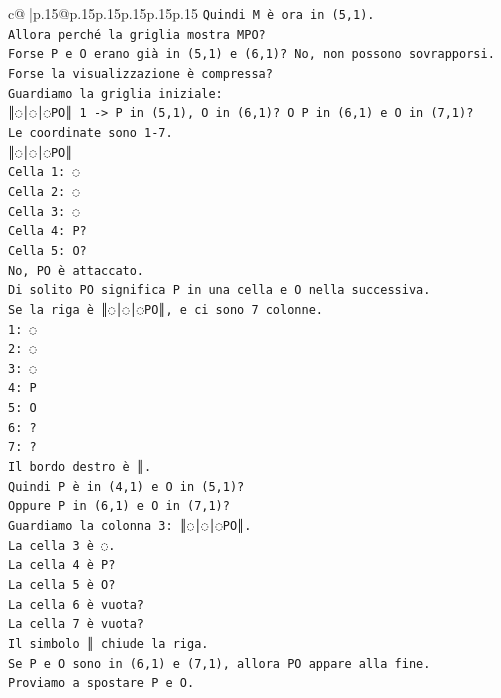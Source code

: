 \documentclass{article}
\begin{document}
{\begin{supertabular}{c@{$\;$}|p{.15\linewidth}@{}p{.15\linewidth}p{.15\linewidth}p{.15\linewidth}p{.15\linewidth}p{.15\linewidth}}
{{{\texttt{Quindi M è ora in (5,1).} \\
\texttt{Allora perché la griglia mostra MPO?} \\
\texttt{Forse P e O erano già in (5,1) e (6,1)? No, non possono sovrapporsi.} \\
\texttt{Forse la visualizzazione è compressa?} \\
\texttt{Guardiamo la griglia iniziale:} \\
\texttt{║◌│◌│◌PO║ 1 {-}> P in (5,1), O in (6,1)? O P in (6,1) e O in (7,1)?} \\
\texttt{Le coordinate sono 1{-}7.} \\
\texttt{║◌│◌│◌PO║} \\
\texttt{Cella 1: ◌} \\
\texttt{Cella 2: ◌} \\
\texttt{Cella 3: ◌} \\
\texttt{Cella 4: P?} \\
\texttt{Cella 5: O?} \\
\texttt{No, PO è attaccato.} \\
\texttt{Di solito PO significa P in una cella e O nella successiva.} \\
\texttt{Se la riga è ║◌│◌│◌PO║, e ci sono 7 colonne.} \\
\texttt{1: ◌} \\
\texttt{2: ◌} \\
\texttt{3: ◌} \\
\texttt{4: P} \\
\texttt{5: O} \\
\texttt{6: ?} \\
\texttt{7: ?} \\
\texttt{Il bordo destro è ║.} \\
\texttt{Quindi P è in (4,1) e O in (5,1)?} \\
\texttt{Oppure P in (6,1) e O in (7,1)?} \\
\texttt{Guardiamo la colonna 3: ║◌│◌│◌PO║.} \\
\texttt{La cella 3 è ◌.} \\
\texttt{La cella 4 è P?} \\
\texttt{La cella 5 è O?} \\
\texttt{La cella 6 è vuota?} \\
\texttt{La cella 7 è vuota?} \\
\texttt{Il simbolo ║ chiude la riga.} \\
\texttt{Se P e O sono in (6,1) e (7,1), allora PO appare alla fine.} \\
\texttt{Proviamo a spostare P e O.} \\
}}}
\end{supertabular}}
\end{document}
